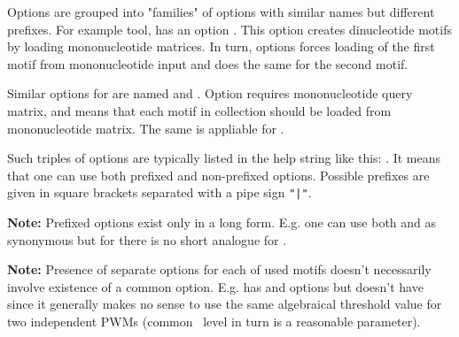 {\small

Options are grouped into "families" of options with similar names but different prefixes. For example  tool, has an option . This option creates dinucleotide motifs by loading mononucleotide matrices. In turn,  options forces loading of the first motif from mononucleotide input and  does the same for the second motif.

Similar options for  are named  and . Option  requires mononucleotide query matrix, and  means that each motif in collection should be loaded from mononucleotide matrix. The same is appliable for .

Such triples of options are typically listed in the help string like this: . It means that one can use both prefixed and non-prefixed options. Possible prefixes are given in square brackets separated with a pipe sign \texttt{"|"}.

\textbf{Note:} Prefixed options exist only in a long form. E.g. one can use both  and  as synonymous but for there is no short analogue for .

\textbf{Note:} Presence of separate options for each of used motifs doesn't necessarily involve existence of a common option. E.g.  has  and  options but doesn't have  since it generally makes no sense to use the same algebraical threshold value for two independent PWMs (common \pvalue\ level in turn is a reasonable parameter).
}
